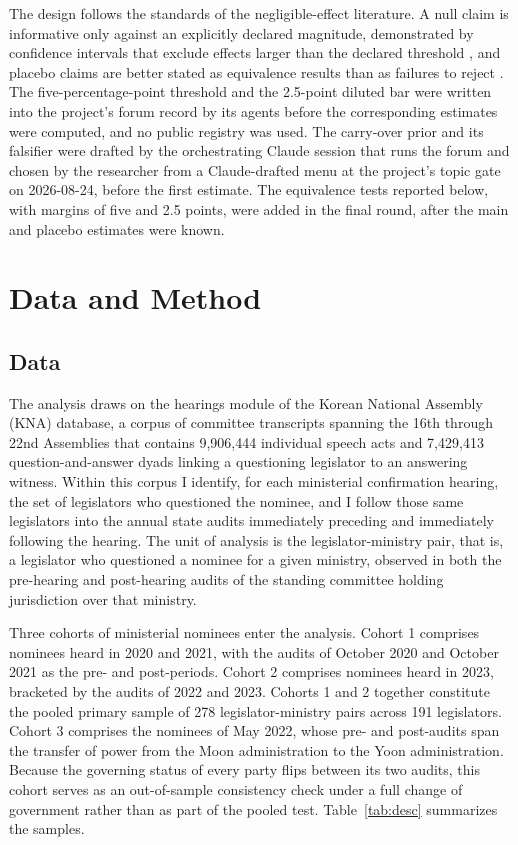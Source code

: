 \documentclass[11pt]{article}
\begin{document}
The design follows the standards of the negligible-effect literature. A null claim is informative only against an explicitly declared magnitude, demonstrated by confidence intervals that exclude effects larger than the declared threshold \citep{rainey2014}, and placebo claims are better stated as equivalence results than as failures to reject \citep{hartman2018}. The five-percentage-point threshold and the 2.5-point diluted bar were written into the project's forum record by its agents before the corresponding estimates were computed, and no public registry was used. The carry-over prior and its falsifier were drafted by the orchestrating Claude session that runs the forum and chosen by the researcher from a Claude-drafted menu at the project's topic gate on 2026-08-24, before the first estimate. The equivalence tests reported below, with margins of five and 2.5 points, were added in the final round, after the main and placebo estimates were known.

\section{Data and Method}

\subsection{Data}

The analysis draws on the hearings module of the Korean National Assembly (KNA) database, a corpus of committee transcripts spanning the 16th through 22nd Assemblies that contains 9,906,444 individual speech acts and 7,429,413 question-and-answer dyads linking a questioning legislator to an answering witness. Within this corpus I identify, for each ministerial confirmation hearing, the set of legislators who questioned the nominee, and I follow those same legislators into the annual state audits immediately preceding and immediately following the hearing. The unit of analysis is the legislator-ministry pair, that is, a legislator who questioned a nominee for a given ministry, observed in both the pre-hearing and post-hearing audits of the standing committee holding jurisdiction over that ministry.

Three cohorts of ministerial nominees enter the analysis. Cohort 1 comprises nominees heard in 2020 and 2021, with the audits of October 2020 and October 2021 as the pre- and post-periods. Cohort 2 comprises nominees heard in 2023, bracketed by the audits of 2022 and 2023. Cohorts 1 and 2 together constitute the pooled primary sample of 278 legislator-ministry pairs across 191 legislators. Cohort 3 comprises the nominees of May 2022, whose pre- and post-audits span the transfer of power from the Moon administration to the Yoon administration. Because the governing status of every party flips between its two audits, this cohort serves as an out-of-sample consistency check under a full change of government rather than as part of the pooled test. Table~\ref{tab:desc} summarizes the samples.
\end{document}
